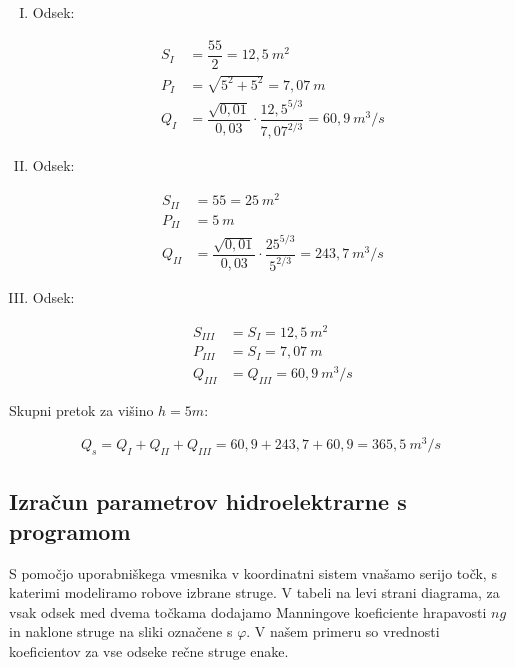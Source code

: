 \begin{enumerate}[I.]
	
	\item Odsek:
	
	\begin{ceqn}
		\begin{align}
		S_I&=\dfrac{5  5}{2} = 12,5~m^2\\
		P_I&=\sqrt{5^2 + 5^2} = 7,07~m\\
		Q_I&=\dfrac{\sqrt{0,01}}{0,03} \cdot \dfrac{12,5^{5/3}}{7,07^{2/3}} = 60,9~m^3/s
		\end{align}
	\end{ceqn}
	
	\item Odsek:
	
	\begin{ceqn}
		\begin{align}
		S_{II}&=55 = 25 ~m^2\\
		P_{II}&=5~m\\
		Q_{II}&=\dfrac{\sqrt{0,01}}{0,03} \cdot \dfrac{25^{5/3}}{5^{2/3}} = 243,7~m^3/s
		\end{align}
	\end{ceqn}
	
	\item Odsek:
	\begin{ceqn}
		\begin{align}
		S_{III}&=S_{I} = 12,5~m^2\\
		P_{III}&=S_{I} = 7,07~m\\
		Q_{III}&=Q_{III} = 60,9~m^3/s
		\end{align}
	\end{ceqn}
	
\end{enumerate}

Skupni pretok za višino $h=5m$:

\begin{ceqn}
	\begin{align}
	Q_{s} = Q_{I} + Q_{II} + Q_{III} = 60,9 + 243,7 + 60,9 = 365,5~m^3/s
	\end{align}
\end{ceqn}




\subsection{Izračun parametrov hidroelektrarne s programom}

S pomočjo uporabniškega vmesnika v koordinatni sistem vnašamo serijo točk, s katerimi modeliramo robove izbrane struge. V tabeli na levi strani diagrama, za vsak odsek med dvema točkama dodajamo Manningove koeficiente hrapavosti $ng$ in naklone struge na sliki označene s $\varphi$. V našem primeru so vrednosti koeficientov za vse odseke rečne struge enake.

